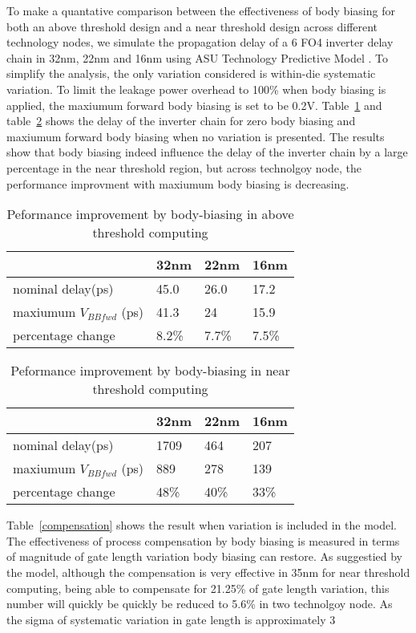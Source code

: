 To make a quantative comparison between the effectiveness of body biasing for both an
above threshold design and a near threshold design across different technology
nodes,  we simulate the propagation  delay of a 6 FO4 inverter delay chain in
32nm, 22nm and 16nm using ASU Technology Predictive Model \cite{PredictiveModel}. To simplify the
analysis, the only variation considered is within-die systematic variation. To limit the leakage power overhead to 100\% when body biasing is applied, the maxiumum forward body biasing is set to be 0.2V.  Table~\ref{body1} and table~\ref{body2} shows the delay of the inverter chain for zero body biasing and maxiumum forward body biasing when no variation is presented. The results show that body biasing indeed influence the delay of the inverter chain by a large percentage in the near threshold region, but across technolgoy node, the performance improvment with maxiumum body biasing is decreasing.   


\begin{table}
  \caption {Peformance improvement by body-biasing in above threshold computing} 
  \centering 
  \label {body1}
  \begin{tabular}{ | l | l | l | l | }
    \hline
    & 32nm & 22nm & 16nm \\ \hline
    nominal delay(ps) & 45.0 & 26.0 & 17.2 \\ \hline
    maxiumum $V_{BBfwd}$ (ps)  & 41.3 & 24 & 15.9 \\  \hline
    percentage change  & 8.2\% & 7.7\% & 7.5\% \\ 
    \hline
  \end{tabular}
\end{table}



\begin{table}
  \caption {Peformance improvement by body-biasing in near threshold computing}  
  \centering
  \label {body2}
  \begin{tabular}{ | l | l | l | l | }
    \hline
    & 32nm & 22nm & 16nm \\ \hline
    nominal delay(ps) & 1709 & 464 & 207 \\ \hline
    maxiumum $V_{BBfwd}$ (ps)  & 889 & 278 & 139 \\  \hline
    percentage change  & 48\% & 40\% & 33\% \\ 
    \hline
  \end{tabular}
\end{table}

Table~\ref{compensation} shows the result when variation is included in the model. The effectiveness of process compensation by body biasing is measured in terms of magnitude of gate length variation body biasing can restore. As suggestied by the model, although the compensation is very effective in 35nm for near threshold computing, being able to compensate for 21.25\% of gate length variation, this number will quickly be quickly be reduced to 5.6\% in two technolgoy node. As the sigma of systematic variation in gate length is approximately 3%

